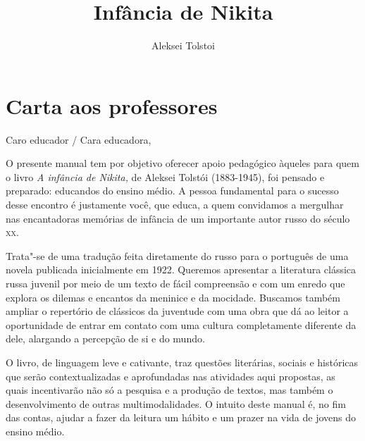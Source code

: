 \documentclass{article}
\begin{document}
\newcommand{\AutorLivro}{Aleksei Tolstoi}
\newcommand{\TituloLivro}{Infância de Nikita}
\newcommand{\Tema}{Ficção, mistério e fantasia}
\newcommand{\Genero}{Romance}
\newcommand{\issnppub}{---}
\newcommand{\issnepub}{---}
\newcommand{\colaborador}{\textbf{Marina Darmaros} é uma pessoa incrível e vai fazer um bom serviço.}


\title{\TituloLivro}
\author{\AutorLivro}
\def\authornotes{\colaborador}

\date{}
\maketitle
\tableofcontents

\pagebreak

\reversemarginpar
\marginparwidth=5cm

\section{Carta aos professores}

Caro educador / Cara educadora,\\\bigskip

O presente manual tem por objetivo oferecer apoio pedagógico àqueles
para quem o livro \emph{A infância de Nikita,} de Aleksei Tolstói
(1883-1945), foi pensado e preparado: educandos do ensino médio. A
pessoa fundamental para o sucesso desse encontro é justamente você, que
educa, a quem convidamos a mergulhar nas encantadoras memórias de
infância de um importante autor russo do século \textsc{xx}.

Trata"-se de uma tradução feita diretamente do russo para o português de
uma novela publicada inicialmente em 1922. Queremos apresentar a
literatura clássica russa juvenil por meio de um texto de fácil
compreensão e com um enredo que explora os dilemas e encantos da
meninice e da mocidade. Buscamos também ampliar o repertório de
clássicos da juventude com uma obra que dá ao leitor a oportunidade de
entrar em contato com uma cultura completamente diferente da dele,
alargando a percepção de si e do mundo.

O livro, de linguagem leve e cativante, traz questões literárias,
sociais e históricas que serão contextualizadas e aprofundadas nas
atividades aqui propostas, as quais incentivarão não só a pesquisa e a
produção de textos, mas também o desenvolvimento de outras
multimodalidades. O intuito deste manual é, no fim das contas, ajudar a
fazer da leitura um hábito e um prazer na vida de jovens do ensino
médio.
\end{document}

